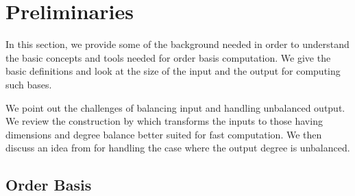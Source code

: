 
\section{Preliminaries}

\label{sec:Background}

In this section, we provide some of the background needed in order
to understand the basic concepts and tools needed for order basis
computation. We give the basic definitions and look at the size of
the input and the output for computing such bases.%
\begin{comment}
, which provide lower bounds for the computational cost 
\end{comment}
{} We point out the challenges of balancing input and handling unbalanced
output. We review the construction by \citet{Storjohann:2006} which
transforms the inputs to those having dimensions and degree balance
better suited for fast computation. We then discuss an idea from \citet{storjohann-villard:2005}
for handling the case where the output degree is unbalanced.


\subsection{Order Basis}

